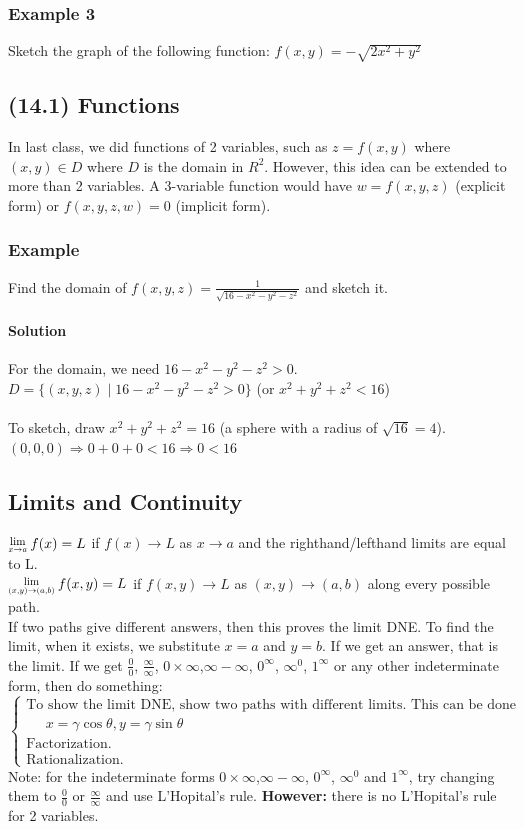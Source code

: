 \documentclass{article}
\newcommand{\Lim}[1]{\raisebox{0.5ex}{\scalebox{0.8}{$\displaystyle \lim_{#1}\;$}}}
\begin{document}
\subsubsection{Example 3}
Sketch the graph of the following function: $f(x,y)=-\sqrt{2x^2+y^2}$

\newpage\subsection{(14.1) Functions}
In last class, we did functions of 2 variables, such as $z=f(x,y)$ where $(x,y)\in D$ where $D$ is the domain in $R^2$.
However, this idea can be extended to more than 2 variables. A 3-variable function would have $w=f(x,y,z)$ (explicit form) or $f(x,y,z,w)=0$ (implicit form).

\subsubsection{Example}
Find the domain of $f(x,y,z)=\frac{1}{\sqrt{16-x^2-y^2-z^2}}$ and sketch it.
\paragraph{Solution} For the domain, we need $16-x^2-y^2-z^2>0$.
\\$D=\{(x,y,z)\;|\;16-x^2-y^2-z^2>0\}$ (or $x^2+y^2+z^2<16$)
\\\\To sketch, draw $x^2+y^2+z^2=16$ (a sphere with a radius of $\sqrt{16}=4$). $(0,0,0)\Rightarrow 0+0+0<16\Rightarrow0<16$

\subsection{Limits and Continuity}
$\Lim{x\to a} f(x)=L$ if $f(x)\rightarrow L$ as $x\rightarrow a$ and the righthand/lefthand limits are equal to L.
\\$\Lim{(x,y)\to(a,b)} f(x,y)=L$ if $f(x,y)\rightarrow L$ as $(x,y)\rightarrow(a,b)$ along every possible path.
\\If two paths give different answers, then this proves the limit DNE. To find the limit, when it exists, we substitute $x=a$ and $y=b$.
If we get an answer, that is the limit. If we get $\frac{0}{0}$, $\frac{\infty}{\infty}$, $0\times\infty$,$\infty-\infty$, $0^{\infty}$, $\infty^0$, $1^{\infty}$
or any other indeterminate form, then do something:\\
$\begin{cases}
    \text{To show the limit DNE, show two paths with different limits. This can be done with polar coordinates}\\\;\;\;\;\;x=\gamma \cos\theta,y=\gamma \sin\theta \\
    \text{Factorization.} \\
    \text{Rationalization.}
\end{cases}$
\\Note: for the indeterminate forms $0\times\infty$,$\infty-\infty$, $0^{\infty}$, $\infty^0$ and $1^{\infty}$,
try changing them to $\frac{0}{0}$ or $\frac{\infty}{\infty}$ and use L'Hopital's rule. \textbf{However:} there is no L'Hopital's rule for 2 variables.
\end{document}
